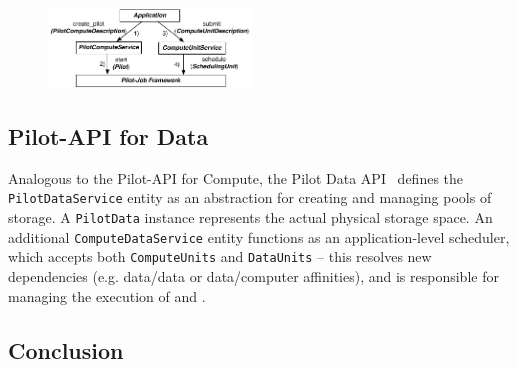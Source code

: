 \documentclass[conference]{IEEEtran}
\begin{document}
\begin{figure}[t]
	\centering
  \upp\up
		\includegraphics[width=0.48\textwidth]{../figures/pilot-api-flow.pdf}
	\caption{}
	\label{fig:figures_pilot_api_flow}
\end{figure}



\subsection{Pilot-API for Data}

Analogous to the Pilot-API for Compute, the Pilot Data
API~\cite{pilot_api} defines the \texttt{PilotDataService} entity as
an abstraction for creating and managing pools of storage. A
\texttt{PilotData} instance represents the actual physical storage
space. An additional \texttt{ComputeDataService} entity functions as an
application-level scheduler, which accepts both
\texttt{Compute\-Units} and \texttt{DataUnits} -- this resolves new
dependencies (e.g. data/data or data/computer affinities), and is
responsible for managing the execution of \dus and \cus.


\subsection{Conclusion}
\end{document}
